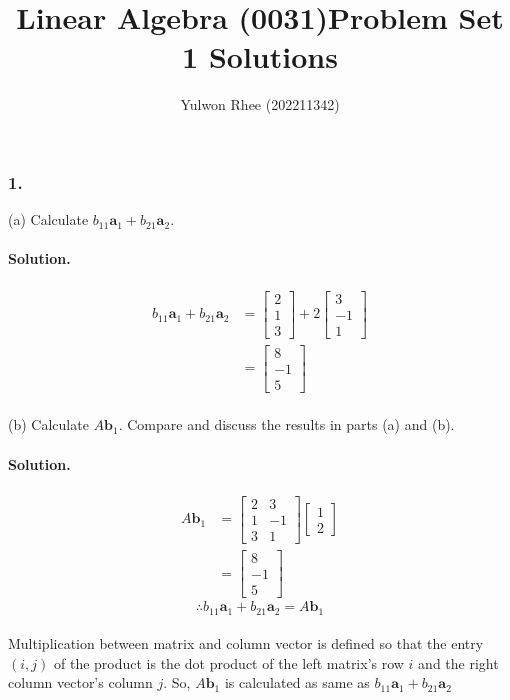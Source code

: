 



\title{Linear Algebra (0031)\newline\space Problem Set 1 Solutions}
\author{Yulwon Rhee (202211342)}

\maketitle
\subsubsection{1.}
(a) Calculate $b_{11}\mathbf{a}_1+b_{21}\mathbf{a}_2$.
\paragraph{Solution.}
\begin{align*}
    b_{11}\mathbf{a}_1+b_{21}\mathbf{a}_2 &= \begin{bmatrix}
        2\\1\\3
    \end{bmatrix} + 2\begin{bmatrix}
        3\\-1\\1
    \end{bmatrix}\\
    &= \begin{bmatrix}
        8\\-1\\5
    \end{bmatrix}
\end{align*}\\

(b) Calculate $A\mathbf{b}_1$. Compare and discuss the results in parts (a) and (b).
\paragraph{Solution.}
\begin{align*}
    A\mathbf{b}_1 &= \begin{bmatrix}
        2&3\\1&-1\\3&1
    \end{bmatrix} \begin{bmatrix}
        1\\2
    \end{bmatrix}\\ &= \begin{bmatrix}
        8\\-1\\5
    \end{bmatrix}
\end{align*}
$$\therefore b_{11}\mathbf{a}_1+b_{21}\mathbf{a}_2=A\mathbf{b}_1$$\\
Multiplication between matrix and column vector is defined so that the entry $(i, j)$ of the product is the dot product of the
left matrix's row $i$ and the right column vector's column $j$. So, $A\mathbf{b}_1$ is calculated as same as $b_{11}\mathbf{a}_1+b_{21}\mathbf{a}_2$\\

